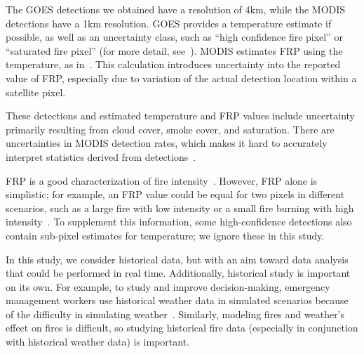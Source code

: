 


The GOES detections we obtained have a resolution of 4km, while the MODIS detections have a 1km resolution. GOES provides a temperature estimate if possible, as well as an uncertainty class, such as ``high confidence fire pixel'' or ``saturated fire pixel'' (for more detail, see~\cite{nesdis2010goes}).
MODIS estimates FRP using the temperature, as in~\cite{Freeborn2014}. This calculation introduces uncertainty into the reported value of FRP, especially due to variation of the actual detection location within a satellite pixel.

These detections and estimated temperature and FRP values include uncertainty primarily resulting from cloud cover, smoke cover, and saturation.
There are uncertainties in MODIS detection rates, which makes it hard to accurately interpret statistics derived from detections~\cite{Hawbaker2008}.

FRP is a good characterization of fire intensity~\cite{Peterson2012b}. However, FRP alone is simplistic; for example, an FRP value could be equal for two pixels in different scenarios, such as a large fire with low intensity or a small fire burning with high intensity~\cite{Peterson2012a}. To supplement this information, some high-confidence detections also contain sub-pixel estimates for temperature; we ignore these in this study.

In this study, we consider historical data, but with an aim toward data analysis that could be performed in real time. Additionally, historical study is important on its own. For example, to study and improve decision-making, emergency management workers use historical weather data in simulated scenarios because of the difficulty in simulating weather~\cite{Baumgart2006}. Similarly, modeling fires and weather's effect on fires is difficult, so studying historical fire data (especially in conjunction with historical weather data) is important.

